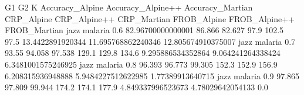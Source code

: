 G1 G2 K Accuracy_Alpine Accuracy_Alpine++ Accuracy_Martian CRP_Alpine CRP_Alpine++ CRP_Martian FROB_Alpine FROB_Alpine++ FROB_Martian
jazz malaria 0.6 82.96700000000001 86.866 82.627 97.9 102.5 97.5 13.4422891920344 11.695768862240346 12.805674910375007
jazz malaria 0.7 93.55 94.058 97.538 129.1 129.8 134.6 9.295886534352864 9.064241264338424 6.3481001575246925
jazz malaria 0.8 96.393 96.773 99.305 152.3 152.9 156.9 6.208315936948888 5.9484227512622985 1.77389913640715
jazz malaria 0.9 97.865 97.809 99.944 174.2 174.1 177.9 4.849337996523673 4.78029642054133 0.0
